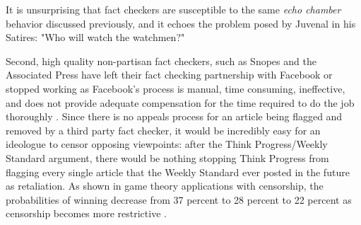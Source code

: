 It is unsurprising that fact checkers are susceptible to the same \textit{echo chamber} behavior discussed previously, and it echoes the problem posed by Juvenal in his Satires: "Who will watch the watchmen?" 

Second, high quality non-partisan fact checkers, such as Snopes and the Associated Press have left their fact checking partnership with Facebook or stopped working as Facebook's process is manual, time consuming, ineffective, and does not provide adequate compensation for the time required to do the job thoroughly \citep{green2019message,coldeway2019update}. Since there is no appeals process for an article being flagged and removed by a third party fact checker, it would be incredibly easy for an ideologue to censor opposing viewpoints: after the Think Progress/Weekly Standard argument, there would be nothing stopping Think Progress from flagging every single article that the Weekly Standard ever posted in the future as retaliation. As shown in game theory applications with censorship, the probabilities of winning decrease from 37 percent to 28 percent to 22 percent as censorship becomes more restrictive \citep{dotsenko2013censorship}.
